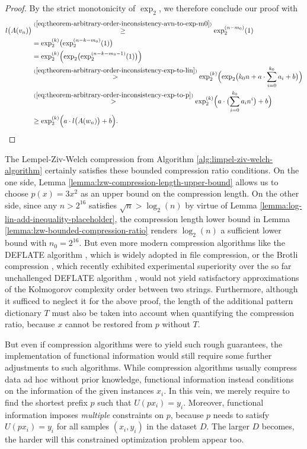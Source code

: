 \begin{proof}
	By the strict monotonicity of $\exp_2$, we therefore conclude our proof with
	\begin{align}
		l\bigl(A(v_n)\bigr)&\overset{(\ref{eq:theorem-arbitrary-order-inconsistency-avn-to-exp-m0})}{\geq}\exp_2^{(n-m_0)}(1)\\
		&= \exp_2^{(k)}\bigl(\exp_2^{(n-k-m_0)}(1)\bigr) \\
		&= \exp_2^{(k)}\Bigl(\exp_2\bigl(\exp_2^{(n-k-m_0-1)}(1)\bigr)\Bigr) \\
		&\overset{(\ref{eq:theorem-arbitrary-order-inconsistency-exp-to-lin})}{>} \exp_2^{(k)}\Bigl(\exp_2\bigl(k_0n+a\cdot \sum_{i=0}^{k_0}a_i + b\bigr)\Bigr)\\
		&\overset{(\ref{eq:theorem-arbitrary-order-inconsistency-exp-to-p})}{>}\exp_2^{(k)}\Bigl( a\cdot \bigl( \sum_{i=0}^{k_0}a_in^{i} \bigr) + b \Bigr)\\
		&\geq \exp_2^{(k)}\Bigl( a\cdot l\bigl(A(w_n)\bigr) + b \Bigr).
	\end{align}
\end{proof}
The Lempel-Ziv-Welch compression from Algorithm \ref{alg:limpel-ziv-welch-algorithm} certainly satisfies these bounded compression ratio conditions.
On the one side, Lemma \ref{lemma:lzw-compression-length-upper-bound} allows us to choose $p(x)=3x^2$ as an upper bound on the compression length.
On the other side, since any $n>2^{16}$ satisfies $\sqrt{n}>\log_2(n)$ by virtue of Lemma \ref{lemma:log-lin-add-inequality-placeholder}, the compression length lower bound in Lemma \ref{lemma:lzw-bounded-compression-ratio} renders $\log_2(n)$ a sufficient lower bound with $n_0=2^{16}$.
But even more modern compression algorithms like the DEFLATE algorithm \cite{deutsch1996rfc1951}, which is widely adopted in file compression, or the Brotli compression \cite{alakuijala2018brotli}, which recently exhibited experimental superiority over the so far unchallenged DEFLATE algorithm \cite{alakuijala2015comparison}, would not yield satisfactory approximations of the Kolmogorov complexity order between two strings.
Furthermore, although it sufficed to neglect it for the above proof, the length of the additional pattern dictionary $T$ must also be taken into account when quantifying the compression ratio, because $x$ cannot be restored from $p$ without $T$.

But even if compression algorithms were to yield such rough guarantees, the implementation of functional information would still require some further adjustments to such algorithms.
While compression algorithms usually compress data ad hoc without prior knowledge, functional information instead conditions on the information of the given instances $x_i$. 
In this vein, we merely require to find the shortest prefix $p$ such that $U(px_i)=y_i$.
Moreover, functional information imposes \textit{multiple} constraints on $p$, because $p$ needs to satisfy $U(px_i)=y_i$ for all samples $(x_i,y_i)$ in the dataset $D$.
The larger $D$ becomes, the harder will this constrained optimization problem appear too.

